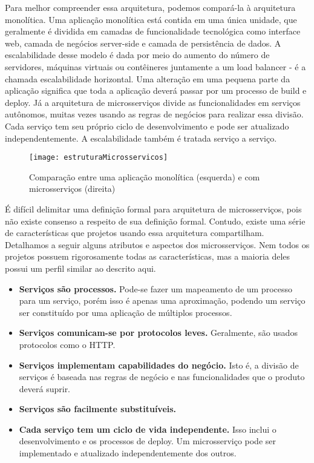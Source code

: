 Para melhor compreender essa arquitetura, podemos compará-la à arquitetura monolítica. Uma aplicação monolítica está contida em uma única unidade, que geralmente é dividida em camadas de funcionalidade tecnológica como interface web, camada de negócios server-side e camada de persistência de dados. A escalabilidade desse modelo é dada por meio do aumento do número de servidores, máquinas virtuais ou contêineres juntamente a um load balancer - é a chamada escalabilidade horizontal. Uma alteração em uma pequena parte da aplicação significa que toda a aplicação deverá passar por um processo de build e deploy. Já a arquitetura de microsserviços divide as funcionalidades em serviços autônomos, muitas vezes usando as regras de negócios para realizar essa divisão. Cada serviço tem seu próprio ciclo de desenvolvimento e pode ser atualizado independentemente. A escalabilidade também é tratada serviço a serviço.

\begin{figure}[H]
	\centering
	\caption{Comparação entre uma aplicação monolítica (esquerda) e com microsserviços (direita)}
  \texttt{[image: estruturaMicrosservicos]}
\label{fig:estruturaMicrosservicos}
\end{figure}

É difícil delimitar uma definição formal para arquitetura de microsserviços, pois não existe consenso a respeito de sua definição formal. Contudo, existe uma série de características que projetos usando essa arquitetura compartilham. Detalhamos a seguir alguns atributos e aspectos dos microsserviços. Nem todos os projetos possuem rigorosamente todas as características, mas a maioria deles possui um perfil similar ao descrito aqui.

\begin{itemize}
\item \textbf{Serviços são processos. }Pode-se fazer um mapeamento de um processo para um serviço, porém isso é apenas uma aproximação, podendo um serviço ser constituído por uma aplicação de múltiplos processos.
\item \textbf{Serviços comunicam-se por protocolos leves. }Geralmente, são usados protocolos como o HTTP.
\item \textbf{Serviços implementam capabilidades do negócio. }Isto é, a divisão de serviços é baseada nas regras de negócio e nas funcionalidades que o produto deverá suprir.
\item \textbf{Serviços são facilmente substituíveis.}
\item \textbf{Cada serviço tem um ciclo de vida independente. }Isso inclui o desenvolvimento e os processos de deploy. Um microsserviço pode ser implementado e atualizado independentemente dos outros.
\end{itemize}

